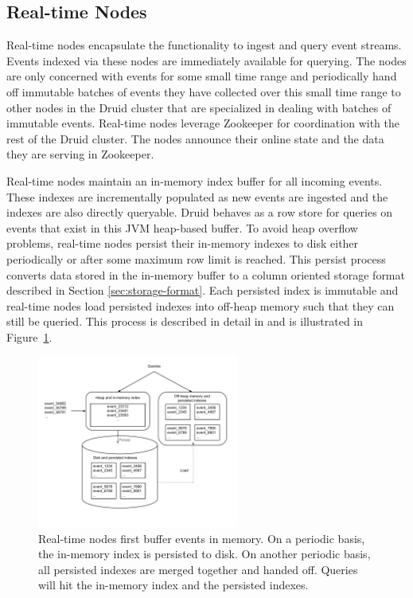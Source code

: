 \documentclass{sig-alternate-2013}
\begin{document}
\newpage
\subsection{Real-time Nodes}
\label{sec:realtime}
Real-time nodes encapsulate the functionality to ingest and query event
streams. Events indexed via these nodes are immediately available for querying.
The nodes are only concerned with events for some small time range and
periodically hand off immutable batches of events they have collected over this
small time range to other nodes in the Druid cluster that are specialized in
dealing with batches of immutable events. Real-time nodes leverage Zookeeper
\cite{hunt2010zookeeper} for coordination with the rest of the Druid cluster.
The nodes announce their online state and the data they are serving in
Zookeeper. 

Real-time nodes maintain an in-memory index buffer for all incoming events.
These indexes are incrementally populated as new events are ingested and the
indexes are also directly queryable.  Druid behaves as a row store
for queries on events that exist in this JVM heap-based buffer. To avoid heap
overflow problems, real-time nodes persist their in-memory indexes to disk
either periodically or after some maximum row limit is reached. This persist
process converts data stored in the in-memory buffer to a column oriented
storage format described in Section \ref{sec:storage-format}. Each persisted
index is immutable and real-time nodes load persisted indexes into off-heap
memory such that they can still be queried. This process is described in detail
in \cite{o1996log} and is illustrated in Figure~\ref{fig:realtime_flow}.

\begin{figure} 
\centering 
\includegraphics[width = 2.6in]{realtime_flow}
\caption{Real-time nodes first buffer events in memory. On a periodic basis,
the in-memory index is persisted to disk. On another periodic basis, all
persisted indexes are merged together and handed off. Queries will hit the
in-memory index and the persisted indexes.}
\label{fig:realtime_flow}
\end{figure}
\end{document}
